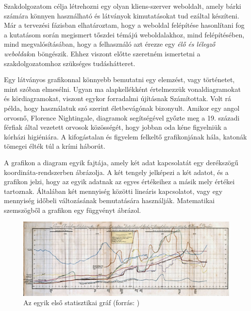 
Szakdolgozatom célja létrehozni egy olyan kliens-szerver weboldalt, amely bárki számára könnyen használható és látványok kimutatásokat tud ezáltal készíteni. Már a tervezési fázisban elhatároztam, hogy a weboldal felépítése hasonlítani fog a kutatásom során megismert tőszdei témájú weboldalakhoz, mind felépítésében, mind megvalósításában, hogy a felhasználó azt érezze egy\textit{ élő és lélegző weboldal}on böngészik. Ehhez viszont előtte szeretném ismertetni a szakdolgozatomhoz szükséges tudáshátteret.


Egy látványos grafikonnal könnyebb bemutatni egy elemzést, vagy történetet, mint szóban elmesélni. Ugyan ma alapkellékként értelmezzük vonaldiagramokat és kördiagramokat, viszont egykor forradalmi újításnak Számítottak. Volt rá példa, hogy használatuk szó szerint életbevágónak bizonyult. Amikor egy angol orvosnő, Florence Nightingale, diagramok segítségével győzte meg a 19. századi férfiak által vezetett orvosok közösségét, hogy jobban oda kéne figyelniük a kórházi higiéniára. A kifogástalan és figyelem felkeltő grafikonjának hála, katonák tömegei élték túl a krími háborút.  \cite{portfolio}

	A grafikon a diagram egyik fajtája, amely két adat kapcsolatát egy derékszögű koordináta-rendszerben ábrázolja. A két tengely jelképezi a két adatot, és a grafikon jelzi, hogy az egyik adatnak az egyes értékeihez a másik mely értékei tartoznak. Általában két mennyiség közötti lineáris kapcsolatot, vagy egy mennyiség időbeli változásának bemutatására használják. Matematikai szemszögből a grafikon egy függvényt ábrázol. \cite{wikiMatek}

\begin{figure}[h]
\centering
\includegraphics[scale=0.5]{images/historyOfGraphs}
\caption{Az egyik első statisztikai gráf (forrás: \cite{oldGraph})}
\end{figure}


